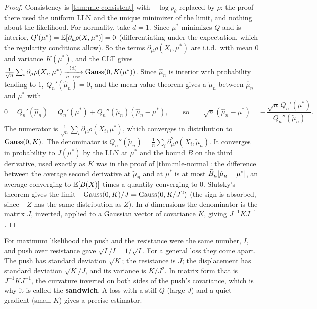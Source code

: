 \begin{proof}
Consistency is \cref{thm:mle-consistent} with $-\log p_\theta$ replaced by $\rho$: the proof there used the uniform LLN and the unique minimizer of the limit, and nothing about the likelihood.
For normality, take $d = 1$.
Since $\mu^*$ minimizes $Q$ and is interior, $Q'(\mu^*) = \operatorname*{\mathbb{E}}[\partial_\mu\rho(X, \mu^*)] = 0$ (differentiating under the expectation, which the regularity conditions allow).
So the terms $\partial_\mu\rho(X_i, \mu^*)$ are i.i.d.\ with mean $0$ and variance $K(\mu^*)$, and the CLT gives $\frac{1}{\sqrt{n}}\sum_i\partial_\mu\rho(X_i, \mu^*) \xrightarrow [n \to \infty ]{\text{(d)}} \text{Gauss}(0, K(\mu^*))$.
Since $\hat{\mu}_n$ is interior with probability tending to $1$, $Q_n'(\hat{\mu}_n) = 0$, and the mean value theorem gives a $\tilde{\mu}_n$ between $\hat{\mu}_n$ and $\mu^*$ with
\[
0 = Q_n'(\hat{\mu}_n) = Q_n'(\mu^*) + Q_n''(\tilde{\mu}_n)(\hat{\mu}_n - \mu^*), \qquad\text{so}\qquad \sqrt{n}(\hat{\mu}_n - \mu^*) = -\,\frac{\sqrt{n}\,Q_n'(\mu^*)}{Q_n''(\tilde{\mu}_n)}.
\]
The numerator is $\frac{1}{\sqrt{n}}\sum_i\partial_\mu\rho(X_i, \mu^*)$, which converges in distribution to $\text{Gauss}(0, K)$.
The denominator is $Q_n''(\tilde{\mu}_n) = \frac1n\sum_i\partial^2_\mu\rho(X_i, \tilde{\mu}_n)$. It converges in probability to $J(\mu^*)$ by the LLN at $\mu^*$ and the bound $B$ on the third derivative, used exactly as $K$ was in the proof of \cref{thm:mle-normal}: the difference between the average second derivative at $\tilde{\mu}_n$ and at $\mu^*$ is at most $\bar{B}_n\lvert\hat{\mu}_n - \mu^*\rvert$, an average converging to $\operatorname*{\mathbb{E}}[B(X)]$ times a quantity converging to $0$.
Slutsky's theorem gives the limit $-\text{Gauss}(0, K)/J = \text{Gauss}(0, K/J^2)$ (the sign is absorbed, since $-Z$ has the same distribution as $Z$).
In $d$ dimensions the denominator is the matrix $J$, inverted, applied to a Gaussian vector of covariance $K$, giving $J^{-1}KJ^{-1}$.
\end{proof}

\begin{intuition}
For maximum likelihood the push and the resistance were the same number, $I$, and push over resistance gave $\sqrt{I}/I = 1/\sqrt{I}$.
For a general loss they come apart.
The push has standard deviation $\sqrt{K}$; the resistance is $J$; the displacement has standard deviation $\sqrt{K}/J$, and its variance is $K/J^2$.
In matrix form that is $J^{-1}KJ^{-1}$, the curvature inverted on both sides of the push's covariance, which is why it is called the \textbf{sandwich}.
A loss with a stiff $Q$ (large $J$) and a quiet gradient (small $K$) gives a precise estimator.
\end{intuition}

